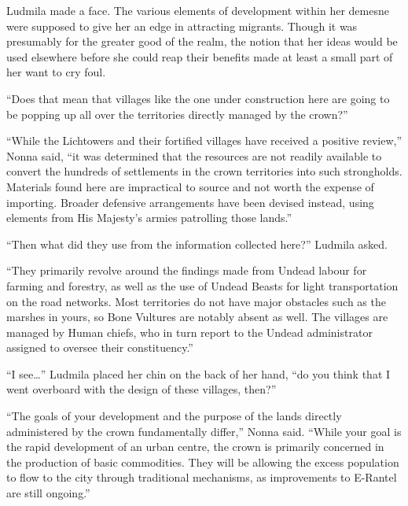  

Ludmila made a face. The various elements of development within her demesne were supposed to give her an edge in attracting migrants. Though it was presumably for the greater good of the realm, the notion that her ideas would be used elsewhere before she could reap their benefits made at least a small part of her want to cry foul.

 

“Does that mean that villages like the one under construction here are going to be popping up all over the territories directly managed by the crown?”

 

“While the Lichtowers and their fortified villages have received a positive review,” Nonna said, “it was determined that the resources are not readily available to convert the hundreds of settlements in the crown territories into such strongholds. Materials found here are impractical to source and not worth the expense of importing. Broader defensive arrangements have been devised instead, using elements from His Majesty’s armies patrolling those lands.”

 

“Then what did they use from the information collected here?” Ludmila asked.

 

“They primarily revolve around the findings made from Undead labour for farming and forestry, as well as the use of Undead Beasts for light transportation on the road networks. Most territories do not have major obstacles such as the marshes in yours, so Bone Vultures are notably absent as well. The villages are managed by Human chiefs, who in turn report to the Undead administrator assigned to oversee their constituency.”

 

“I see…” Ludmila placed her chin on the back of her hand, “do you think that I went overboard with the design of these villages, then?”

 

“The goals of your development and the purpose of the lands directly administered by the crown fundamentally differ,” Nonna said. “While your goal is the rapid development of an urban centre, the crown is primarily concerned in the production of basic commodities. They will be allowing the excess population to flow to the city through traditional mechanisms, as improvements to E-Rantel are still ongoing.”

 

